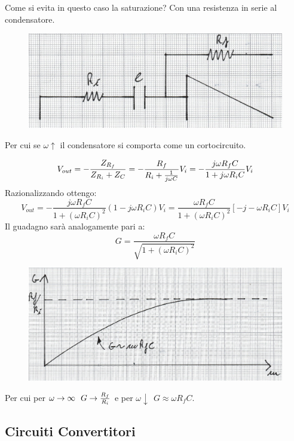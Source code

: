 \documentclass[a4paper, 15pt]{article}
\begin{document}
\begin{adjustwidth}{2in}{}
   		Come si evita in questo caso la saturazione? Con una resistenza in serie al condensatore.   		
   		\begin{figure}[H]
   			\centering
   			\includegraphics[width=0.5\linewidth]{immagini/mm(12)}
   			\label{fig:mm12}
   		\end{figure} 		
   		Per cui se $\omega\uparrow$ il condensatore si comporta come un cortocircuito. 
   		
   		\[V_{out} = -{Z_{R_f}\over Z_{R_i} + Z_C} = -\dfrac{R_f}{R_i + {1\over j\omega C}}V_i = -\dfrac{j\omega R_fC}{1+j\omega R_iC}V_i \] 
   		Razionalizzando ottengo:
   		\[V_{out} = - \dfrac{j\omega R_f C}{1+(\omega R_iC)^2}(1-j\omega R_iC)V_i = \dfrac{\omega R_fC}{1+(\omega R_iC)^2}\left[-j-\omega R_iC\right]V_i\]
   		Il guadagno sarà analogamente pari a: 
   		\[ G = \dfrac{\omega R_fC}{\sqrt{1+(\omega R_iC)^2}}\]
\begin{figure}[H]
	\centering
	\includegraphics[width=0.5\linewidth]{immagini/mm(13)}
	\label{fig:mm13}
\end{figure}
   		Per cui per $\omega\rightarrow\infty ~~ G\rightarrow{R_f\over R_i}$ e per $\omega\downarrow ~~ G \approx\omega R_fC$. \newline 
\end{adjustwidth}
\newpage
\subsection{Circuiti Convertitori}
\end{document}
